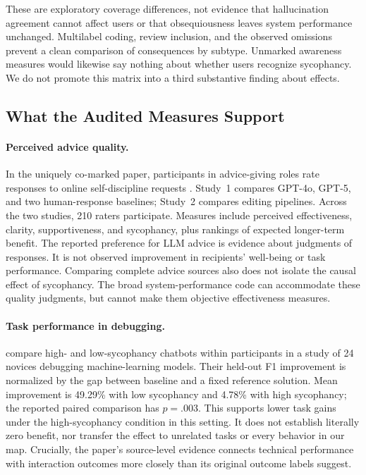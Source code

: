 \documentclass[letterpaper]{article}
\begin{document}
These are exploratory coverage differences, not evidence that hallucination agreement cannot affect users or that obsequiousness leaves system performance unchanged. Multilabel coding, review inclusion, and the observed omissions prevent a clean comparison of consequences by subtype. Unmarked awareness measures would likewise say nothing about whether users recognize sycophancy. We do not promote this matrix into a third substantive finding about effects.

\subsection{What the Audited Measures Support}
\paragraph{Perceived advice quality.}
In the uniquely co-marked paper, participants in advice-giving roles rate responses to online self-discipline requests \citep{10.1145/3772318.3791233}. Study~1 compares GPT-4o, GPT-5, and two human-response baselines; Study~2 compares editing pipelines. Across the two studies, 210 raters participate. Measures include perceived effectiveness, clarity, supportiveness, and sycophancy, plus rankings of expected longer-term benefit. The reported preference for LLM advice is evidence about judgments of responses. It is not observed improvement in recipients' well-being or task performance. Comparing complete advice sources also does not isolate the causal effect of sycophancy. The broad system-performance code can accommodate these quality judgments, but cannot make them objective effectiveness measures.

\paragraph{Task performance in debugging.}
\citet{10.1145/3772318.3791365} compare high- and low-sycophancy chatbots within participants in a study of 24 novices debugging machine-learning models. Their held-out F1 improvement is normalized by the gap between baseline and a fixed reference solution. Mean improvement is 49.29\% with low sycophancy and 4.78\% with high sycophancy; the reported paired comparison has $p=.003$. This supports lower task gains under the high-sycophancy condition in this setting. It does not establish literally zero benefit, nor transfer the effect to unrelated tasks or every behavior in our map. Crucially, the paper's source-level evidence connects technical performance with interaction outcomes more closely than its original outcome labels suggest.
\end{document}
